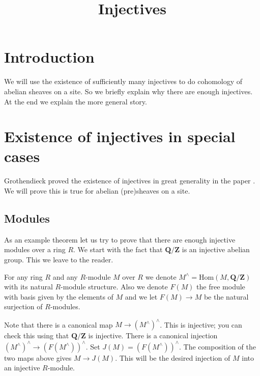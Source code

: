 

%


\title{Injectives}


\maketitle

\tableofcontents

\section{Introduction}
\label{section-introduction}

\noindent
We will use the existence of sufficiently many injectives to
do cohomology of abelian sheaves on a site. So we briefly 
explain why there are enough injectives. At the end we explain
the more general story.

\section{Existence of injectives in special cases}
\label{section-foundational}

\noindent
Grothendieck proved the existence of injectives in great generality 
in the paper \cite{Tohoku}. We will prove this is true for abelian
(pre)sheaves on a site.

\subsection{Modules}
\label{subsection-injectives-modules}

\noindent 
As an example theorem let us try to prove that there are enough injective
modules over a ring $R$. We start with the fact that $\mathbf{Q}/\mathbf{Z}$ 
is an injective abelian group. This we leave to the reader.

\smallskip\noindent
For any ring $R$ and any $R$-module $M$ over $R$ we denote 
$M^\wedge = \text{Hom}(M,\mathbf{Q}/\mathbf{Z})$
with its natural $R$-module structure. Also we denote
$F(M)$ the free module with basis given by the elements 
of $M$ and we let $F(M)\to M$ be the natural surjection of $R$-modules.

\smallskip\noindent
Note that there is a canonical map $M \to (M^\wedge)^\wedge$.
This is injective; you can check this using that 
$\mathbf{Q}/\mathbf{Z}$ is injective. There is a canonical 
injection $(M^\wedge)^\wedge \to (F(M^\wedge))^\wedge$.
Set $J(M)=(F(M^\wedge))^\wedge$. The composition of the two maps
above gives $M \to J(M)$. This will be the desired injection of $M$ 
into an injective $R$-module.

